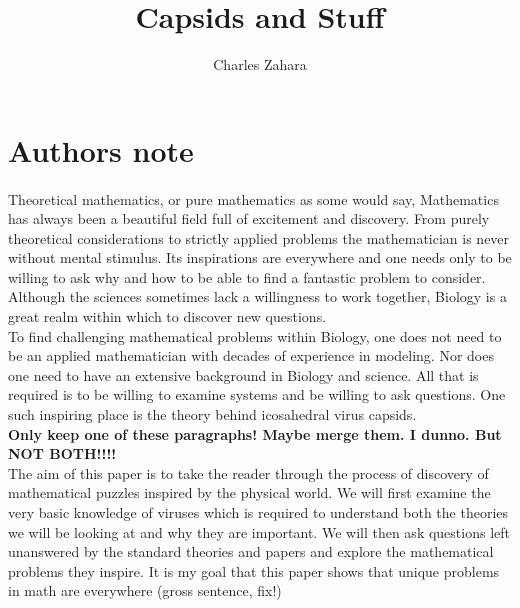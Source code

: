 \documentclass[12pt,letter]{article}
\begin{document}
\title{Capsids and Stuff}
\author{Charles Zahara}
\maketitle

\section*{Authors note}

\paragraph{}
Theoretical mathematics, or pure mathematics as some would say, 
Mathematics has always been a beautiful field full of excitement and discovery. From purely theoretical considerations to strictly \cite{Zlotnick:2005} applied problems the mathematician is never without mental stimulus. Its inspirations are everywhere and one needs only to be willing to \cite{Mannige:2009} ask why and how to be able to find a fantastic problem to consider. Although the sciences sometimes lack a willingness to work together, Biology is a great realm within which to discover new questions. \\

To find challenging mathematical problems within Biology, one does not need to be an applied mathematician with decades of experience in modeling. Nor does one need to have an extensive background in Biology and science. All that is required is to be willing to examine systems and be willing to ask questions. One such inspiring place is the theory behind icosahedral virus capsids. \\

\textbf{Only keep one of these paragraphs! Maybe merge them. I dunno. But NOT BOTH!!!!} \\

The aim of this paper is to take the reader through the process of discovery of mathematical puzzles inspired by the physical world. We will first examine the very basic knowledge of viruses which is required to understand both the theories we will be looking at and why they are important. We will then ask questions left unanswered by the standard theories and papers and explore the mathematical problems they inspire. It is my goal that this paper shows that unique problems in math are everywhere (gross sentence, fix!) \\
\end{document}
